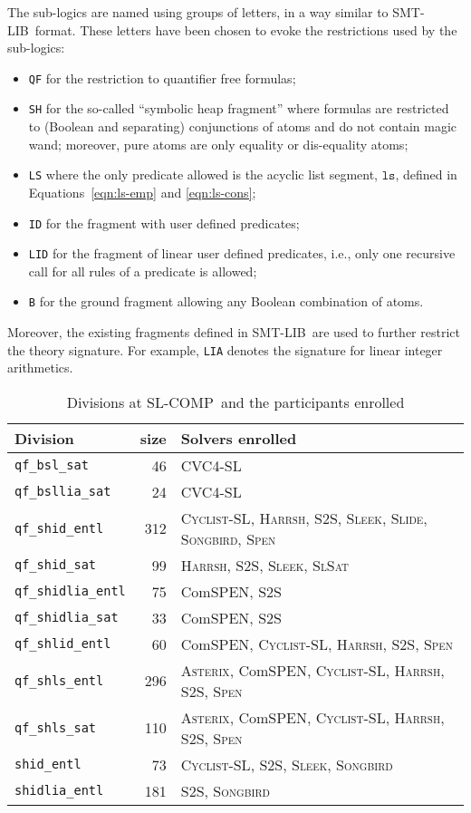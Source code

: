 \documentclass[orivec]{llncs}
\newcommand{\ls}{\mathtt{ls}}
\newcommand{\ASTERIX}{\textsc{Asterix}}
\newcommand{\CYCLIST}{\textsc{Cyclist-SL}}
\newcommand{\ComSPEN}{Com\textsc{SPEN}}
\newcommand{\CVC}{\textsc{CVC4-SL}}
\newcommand{\HARRSH}{\textsc{Harrsh}}
\newcommand{\STS}{\textsc{S2S}}
\newcommand{\SLEEK}{\textsc{Sleek}}
\newcommand{\SLIDE}{\textsc{Slide}}
\newcommand{\SLSAT}{\textsc{SlSat}}
\newcommand{\SG}{\textsc{Songbird}}
\newcommand{\SPEN}{\textsc{Spen}}
\newcommand{\smtlib}{\textsf{SMT-LIB}}
\newcommand{\slcomp}{\textsf{SL-COMP}}
\begin{document}
The sub-logics are named using groups of letters, in a way similar to \smtlib\ format. 
These letters have been chosen to evoke the restrictions
used by the sub-logics:
\begin{itemize}
\item {\tt QF} for the restriction to quantifier free formulas;
\item {\tt SH} for the so-called ``symbolic heap fragment''  where formulas are restricted to (Boolean and separating) conjunctions of atoms and do not contain magic wand; moreover, pure atoms are only equality or dis-equality atoms;
\item {\tt LS} where the only predicate allowed is the acyclic list segment, $\ls$, defined in Equations~\ref{eqn:ls-emp} and \ref{eqn:ls-cons};
\item {\tt ID} for the fragment with user defined predicates;
\item {\tt LID} for the fragment of linear user defined predicates, i.e., only one recursive call for all rules of a predicate is allowed;
\item {\tt B} for the ground fragment allowing any Boolean combination of atoms.
\end{itemize}
Moreover, the existing fragments defined in \smtlib\ are used 
to further restrict the theory signature. 
For example, {\tt LIA} denotes the signature for linear integer arithmetics.

\begin{table}
\caption{Divisions at \slcomp\ and the participants enrolled}
\label{tab:div}
\begin{tabular}{l@{\quad}r@{\quad}l}\hline
Division & size & Solvers enrolled \\
\hline\hline
\texttt{qf\_bsl\_sat} & 46 & \CVC \\
\texttt{qf\_bsllia\_sat} & 24 & \CVC \\
\texttt{qf\_shid\_entl} & 312 & \CYCLIST, \HARRSH, \STS, \SLEEK, \SLIDE, \SG, \SPEN \\
\texttt{qf\_shid\_sat} & 99 & \HARRSH, \STS, \SLEEK, \SLSAT \\
\texttt{qf\_shidlia\_entl} & 75 & \ComSPEN, \STS\\
\texttt{qf\_shidlia\_sat} & 33 & \ComSPEN, \STS\\
\texttt{qf\_shlid\_entl} & 60 & \ComSPEN, \CYCLIST, \HARRSH, \STS, \SPEN\\
\texttt{qf\_shls\_entl} & 296 & \ASTERIX, \ComSPEN, \CYCLIST, \HARRSH, \STS, \SPEN\\
\texttt{qf\_shls\_sat} & 110 & \ASTERIX, \ComSPEN, \CYCLIST, \HARRSH, \STS, \SPEN \\
\texttt{shid\_entl} & 73 & \CYCLIST, \STS, \SLEEK, \SG \\
\texttt{shidlia\_entl} & 181 & \STS, \SG \\
\hline
\end{tabular}
\end{table}
\end{document}
